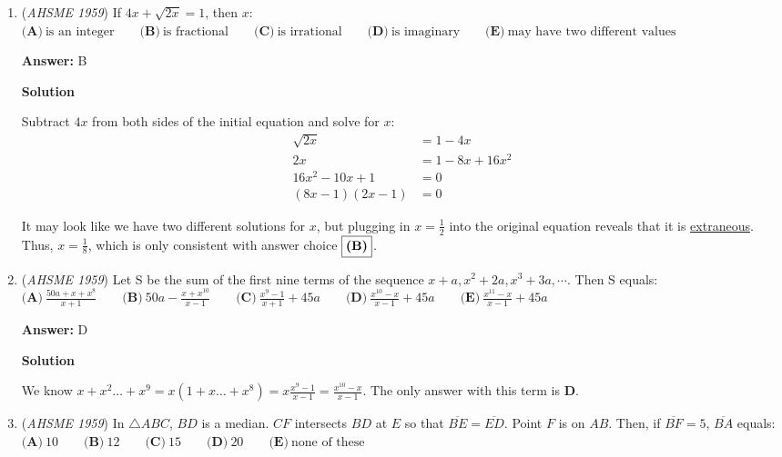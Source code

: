 \begin{enumerate}
 


	\item (\textit{AHSME 1959}) If $4x+\sqrt{2x}=1$, then $x$:
$\textbf{(A)}\ \text{is an integer} \qquad\textbf{(B)}\ \text{is fractional}\qquad\textbf{(C)}\ \text{is irrational}\qquad\textbf{(D)}\ \text{is imaginary}\qquad\textbf{(E)}\ \text{may have two different values}$

 \textbf{Answer: }B



\textbf{Solution}

Subtract $4x$ from both sides of the initial equation and solve for $x$:\begin{align*}\sqrt{2x} &= 1-4x \\2x &= 1-8x+16x^2 \\16x^2-10x+1 &= 0 \\(8x-1)(2x-1) &= 0\end{align*}


 It may look like we have two different solutions for $x$, but plugging in $x=\frac{1}{2}$ into the original equation reveals that it is \href{https://artofproblemsolving.com/wiki/index.php?title=Extraneous\_solutions}{extraneous}. Thus, $x=\frac{1}{8}$, which is only consistent with answer choice $\fbox{\textbf{(B)}}$.

 


	\item (\textit{AHSME 1959}) Let S be the sum of the first nine terms of the sequence $x+a, x^2+2a, x^3+3a, \cdots.$
Then S equals:
$\textbf{(A)}\ \frac{50a+x+x^8}{x+1} \qquad\textbf{(B)}\ 50a-\frac{x+x^{10}}{x-1}\qquad\textbf{(C)}\ \frac{x^9-1}{x+1}+45a\qquad\textbf{(D)}\ \frac{x^{10}-x}{x-1}+45a\qquad\textbf{(E)}\ \frac{x^{11}-x}{x-1}+45a$

 \textbf{Answer: }D



\textbf{Solution}

We know $x+x^2\dots+x^9=x(1+x\dots+x^8)=x\frac{x^9-1}{x-1}=\frac{x^{10}-x}{x-1}$. The only answer with this term is $\boxed{\textbf{D}}$.

 


	\item (\textit{AHSME 1959}) In $\triangle ABC$, $BD$ is a median. $CF$ intersects $BD$ at $E$ so that $\overline{BE}=\overline{ED}$. Point $F$ is on $AB$. Then, if $\overline{BF}=5$, 
$\overline{BA}$ equals:
$\textbf{(A)}\ 10 \qquad\textbf{(B)}\ 12\qquad\textbf{(C)}\ 15\qquad\textbf{(D)}\ 20\qquad\textbf{(E)}\ \text{none of these}$


\end{enumerate}
